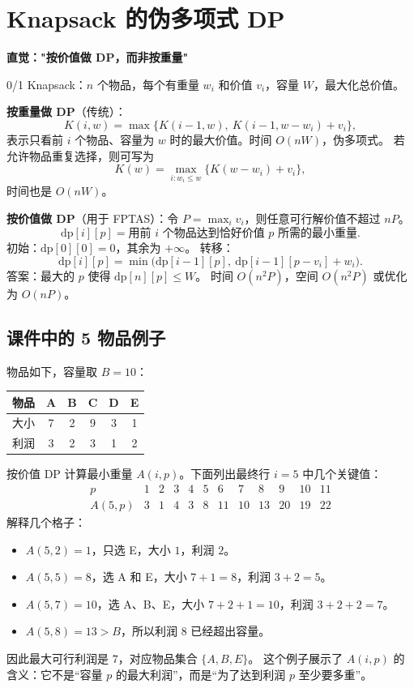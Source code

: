 \documentclass[UTF8,openany,12pt]{ctexbook}
\theoremstyle{remark}
\begin{document}
\section{Knapsack 的伪多项式 DP}

\textbf{直觉："按价值做 DP，而非按重量"}

0/1 Knapsack：$n$ 个物品，每个有重量 $w_i$ 和价值 $v_i$，容量 $W$，最大化总价值。

\textbf{按重量做 DP}（传统）：
\[
  K(i,w)=\max\{K(i-1,w),\ K(i-1,w-w_i)+v_i\},
\]
表示只看前 $i$ 个物品、容量为 $w$ 时的最大价值。时间 $O(nW)$，伪多项式。
若允许物品重复选择，则可写为
\[
  K(w)=\max_{i:w_i\le w}\{K(w-w_i)+v_i\},
\]
时间也是 $O(nW)$。

\textbf{按价值做 DP}（用于 FPTAS）：令 $P=\max_i v_i$，则任意可行解价值不超过 $nP$。
\[
  \text{dp}[i][p] = \text{用前 } i \text{ 个物品达到恰好价值 } p \text{ 所需的最小重量}.
\]
初始：$\text{dp}[0][0] = 0$，其余为 $+\infty$。
转移：
\[
  \text{dp}[i][p] = \min\bigl(\text{dp}[i-1][p],\ \text{dp}[i-1][p-v_i] + w_i\bigr).
\]
答案：最大的 $p$ 使得 $\text{dp}[n][p] \le W$。
时间 $O(n^2P)$，空间 $O(n^2P)$ 或优化为 $O(nP)$。

\subsection{课件中的 5 物品例子}

物品如下，容量取 $B=10$：

\begin{center}
\begin{tabular}{c|ccccc}
  \toprule
  物品 & A & B & C & D & E\\
  \midrule
  大小 & 7 & 2 & 9 & 3 & 1\\
  利润 & 3 & 2 & 3 & 1 & 2\\
  \bottomrule
\end{tabular}
\end{center}

按价值 DP 计算最小重量 $A(i,p)$。下面列出最终行 $i=5$ 中几个关键值：
\[
\begin{array}{c|ccccccccccc}
p      & 1&2&3&4&5&6&7&8&9&10&11\\
\hline
A(5,p) &3&1&4&3&8&11&10&13&20&19&22
\end{array}
\]
解释几个格子：
\begin{itemize}
  \item $A(5,2)=1$，只选 E，大小 $1$，利润 $2$。
  \item $A(5,5)=8$，选 A 和 E，大小 $7+1=8$，利润 $3+2=5$。
  \item $A(5,7)=10$，选 A、B、E，大小 $7+2+1=10$，利润 $3+2+2=7$。
  \item $A(5,8)=13>B$，所以利润 $8$ 已经超出容量。
\end{itemize}
因此最大可行利润是 $7$，对应物品集合 $\{A,B,E\}$。
这个例子展示了 $A(i,p)$ 的含义：它不是“容量 $p$ 的最大利润”，而是“为了达到利润 $p$ 至少要多重”。
\end{document}
